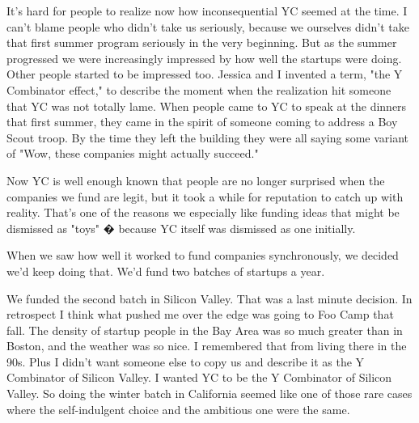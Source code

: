                   
                    It's hard for people to realize now how inconsequential YC
                    seemed at the time. I can't blame people who didn't take us
                    seriously, because we ourselves didn't take that first
                    summer program seriously in the very beginning. But as the
                    summer progressed we were increasingly impressed by how well
                    the startups were doing. Other people started to be
                    impressed too. Jessica and I invented a term, "the Y
                    Combinator effect," to describe the moment when the
                    realization hit someone that YC was not totally lame. When
                    people came to YC to speak at the dinners that first summer,
                    they came in the spirit of someone coming to address a Boy
                    Scout troop. By the time they left the building they were
                    all saying some variant of "Wow, these companies might
                    actually succeed."
                  


                  
                    Now YC is well enough known that people are no longer
                    surprised when the companies we fund are legit, but it took
                    a while for reputation to catch up with reality. That's one
                    of the reasons we especially like funding ideas that might
                    be dismissed as "toys" � because YC itself was dismissed as
                    one initially.
                  


                  
                    When we saw how well it worked to fund companies
                    synchronously, we decided we'd keep doing that. We'd fund
                    two batches of startups a year.
                  


                  
                    We funded the second batch in Silicon Valley. That was a
                    last minute decision. In retrospect I think what pushed me
                    over the edge was going to Foo Camp that fall. The density
                    of startup people in the Bay Area was so much greater than
                    in Boston, and the weather was so nice. I remembered that
                    from living there in the 90s. Plus I didn't want someone
                    else to copy us and describe it as the Y Combinator of
                    Silicon Valley. I wanted YC to be the Y Combinator of
                    Silicon Valley. So doing the winter batch in California
                    seemed like one of those rare cases where the self-indulgent
                    choice and the ambitious one were the same.
                  


